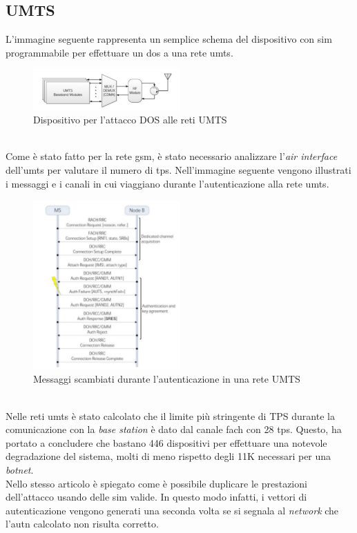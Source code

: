 \clearpage

\subsection{UMTS}
L'immagine seguente rappresenta un semplice schema del dispositivo con \gls{sim} programmabile per effettuare un \gls{dos} a una rete \gls{umts}\cite{umts-dos}.
\begin{figure}[h]
    \centering
    \includegraphics[width=0.5\textwidth]{images/umts-dos-device.png}
    \caption{Dispositivo per l'attacco DOS alle reti UMTS\cite{umts-dos}}
\end{figure}\\
Come è stato fatto per la rete \gls{gsm}, è stato necessario analizzare l'\textit{air interface} dell'\gls{umts} per valutare il numero di \gls{tps}.
Nell'immagine seguente vengono illustrati i messaggi e i canali in cui viaggiano durante l'autenticazione alla rete \gls{umts}.
\begin{figure}[h]
    \centering
    \includegraphics[width=0.5\textwidth]{images/umts-air-channel.png}
    \caption{Messaggi scambiati durante l'autenticazione in una rete UMTS\cite{umts-dos}}
\end{figure}\\
Nelle reti \gls{umts} è stato calcolato che il limite più stringente di TPS durante la comunicazione con la \textit{base station} è dato dal canale \gls{fach} con 28 \gls{tps}.
Questo, ha portato a concludere che bastano 446 dispositivi per effettuare una notevole degradazione del sistema, molti di meno rispetto degli 11K necessari per una \textit{botnet}\cite{dos-imsi}.\\
Nello stesso articolo è spiegato come è possibile duplicare le prestazioni dell'attacco usando delle \gls{sim} valide. In questo modo infatti, i vettori di autenticazione vengono generati una seconda volta se si segnala al
\textit{network} che l'\gls{autn} calcolato non risulta corretto.
